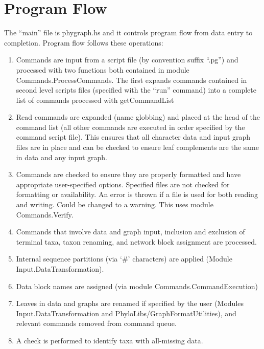 \documentclass[11pt]{article}
\begin{document}
	\section{Program Flow}
	The ``main'' file is phygraph.hs and it controls program flow from data entry to completion.
	Program flow follows these operations:
	\begin{enumerate}
		\item{Commands are input from a script file (by convention suffix ``.pg'') and processed with two functions both contained in module Commands.ProcessCommands.  The first expands commands contained in second level scripts files (specified with the ``run'' command) into a complete
		list of commands processed with getCommandList} 
	
		\item{Read commands are expanded (name globbing) and placed at the head of the command list (all other commands are executed in order
			specified by the command script file).  This ensures that all character data and input graph files are in place and can be checked to 
			ensure leaf complements are the same in data and any input graph.}
		
		\item{Commands are checked to ensure they are properly formatted and have appropriate user-specified options.  Specified files are not checked
			for formatting or availability.  An error is thrown if a file is used for both reading and writing.  Could be changed to a warning.
			This uses module Commands.Verify.}
		
		\item{Commands that involve data and graph input, inclusion and exclusion of terminal taxa, taxon renaming, and network 
			block assignment are processed.}
		
		\item{Internal sequence partitions (via `\#' characters) are applied (Module Input.DataTransformation).}
		
		\item{Data block names are assigned (via module Commands.CommandExecution)}
		
		\item{Leaves in data and graphs are renamed if specified by the user (Modules Input.DataTransformation and PhyloLibs/GraphFormatUtilities), 
			and relevant commands
			removed from command queue.}
		
		\item{A check is performed to identify taxa with all-missing data.}
		

\end{enumerate}
\end{document}
